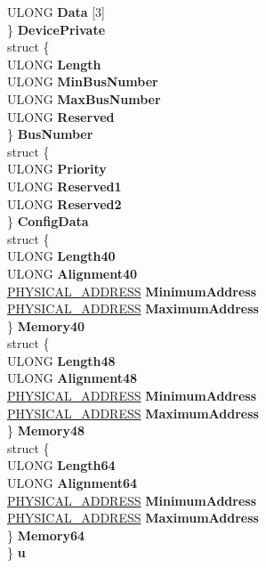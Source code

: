 \begin{DoxyCompactItemize}
\begin{tabbing}
\>\>ULONG {\bfseries Data} \mbox{[}3\mbox{]}\\
\>\} {\bfseries DevicePrivate}\\
\>struct \{\\
\>\>ULONG {\bfseries Length}\\
\>\>ULONG {\bfseries MinBusNumber}\\
\>\>ULONG {\bfseries MaxBusNumber}\\
\>\>ULONG {\bfseries Reserved}\\
\>\} {\bfseries BusNumber}\\
\>struct \{\\
\>\>ULONG {\bfseries Priority}\\
\>\>ULONG {\bfseries Reserved1}\\
\>\>ULONG {\bfseries Reserved2}\\
\>\} {\bfseries ConfigData}\\
\>struct \{\\
\>\>ULONG {\bfseries Length40}\\
\>\>ULONG {\bfseries Alignment40}\\
\>\>\hyperlink{union___l_a_r_g_e___i_n_t_e_g_e_r}{PHYSICAL\_ADDRESS} {\bfseries MinimumAddress}\\
\>\>\hyperlink{union___l_a_r_g_e___i_n_t_e_g_e_r}{PHYSICAL\_ADDRESS} {\bfseries MaximumAddress}\\
\>\} {\bfseries Memory40}\\
\>struct \{\\
\>\>ULONG {\bfseries Length48}\\
\>\>ULONG {\bfseries Alignment48}\\
\>\>\hyperlink{union___l_a_r_g_e___i_n_t_e_g_e_r}{PHYSICAL\_ADDRESS} {\bfseries MinimumAddress}\\
\>\>\hyperlink{union___l_a_r_g_e___i_n_t_e_g_e_r}{PHYSICAL\_ADDRESS} {\bfseries MaximumAddress}\\
\>\} {\bfseries Memory48}\\
\>struct \{\\
\>\>ULONG {\bfseries Length64}\\
\>\>ULONG {\bfseries Alignment64}\\
\>\>\hyperlink{union___l_a_r_g_e___i_n_t_e_g_e_r}{PHYSICAL\_ADDRESS} {\bfseries MinimumAddress}\\
\>\>\hyperlink{union___l_a_r_g_e___i_n_t_e_g_e_r}{PHYSICAL\_ADDRESS} {\bfseries MaximumAddress}\\
\>\} {\bfseries Memory64}\\
\} {\bfseries u}\\


\end{tabbing}
\end{DoxyCompactItemize}
